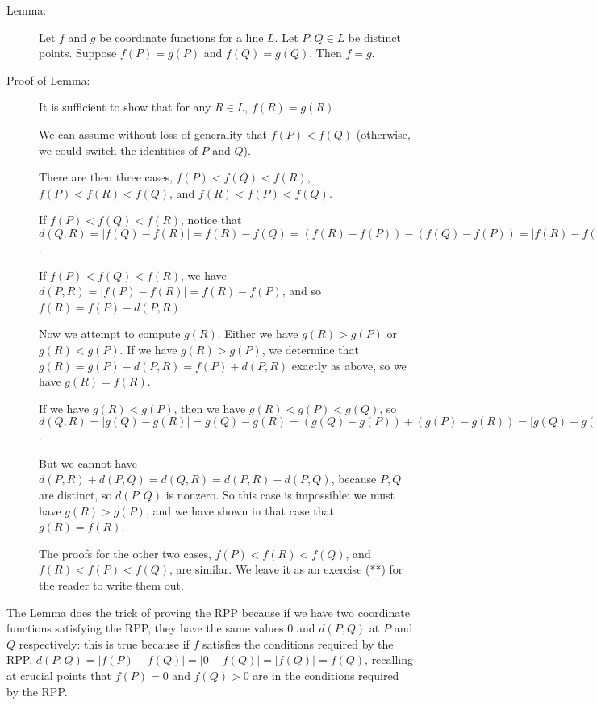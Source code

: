 \documentclass[12pt]{article}
\begin{document}
\begin{description}

\item[Lemma:]  Let $f$ and $g$ be coordinate functions for a line $L$.  Let $P,Q \in L$ be distinct points.  Suppose $f(P)= g(P)$ and
$f(Q)=g(Q)$.   Then $f=g$.

\item[Proof of Lemma:] It is sufficient to show that for any $R \in L$, $f(R)=g(R)$.

We can assume without loss of generality that $f(P) < f(Q)$ (otherwise, we could switch the identities of $P$ and $Q$).

There are then three cases, $f(P) < f(Q) <f(R)$, $f(P) < f(R) <f(Q)$, and $f(R) < f(P) <f(Q)$.

If $f(P)<f(Q)<f(R)$, notice that $d(Q,R) = |f(Q)-f(R)| = f(R)-f(Q)= (f(R)-f(P)) - (f(Q)-f(P)) = |f(R)-f(P)| - |f(Q)-f(P)| = d(P,R)-d(P,Q))$.

If $f(P) < f(Q) <f(R)$, we have $d(P,R) = |f(P)-f(R)| = f(R)-f(P)$, and so $f(R) = f(P)+d(P,R)$. 

Now we attempt to compute $g(R)$.  Either we have $g(R)>g(P)$ or $g(R)<g(P)$.  If we have $g(R)>g(P)$, we determine that $g(R) = g(P) + d(P,R) = f(P)+d(P,R)$ exactly as above, so we have $g(R)=f(R)$.

If we have $g(R)<g(P)$, then we have $g(R) < g(P) < g(Q)$, so $d(Q,R) = |g(Q)-g(R)| = g(Q)-g(R) = (g(Q)-g(P))+(g(P)-g(R)) = |g(Q)-g(P)|+|g(P)-g(R)| = d(P,R)+d(P,Q)$.

But we cannot have $d(P,R)+d(P,Q) = d(Q,R)=d(P,R)-d(P,Q)$, because $P,Q$ are distinct, so $d(P,Q)$ is nonzero.  So this case is impossible:
we must have $g(R)>g(P)$, and we have shown in that case that $g(R)=f(R)$.

The proofs for the other two cases, $f(P) < f(R) <f(Q)$, and $f(R) < f(P) <f(Q)$, are similar.  We leave it as an exercise (**) for the reader to write them out.

\end{description}

The Lemma does the trick of proving the RPP because if we have two coordinate functions satisfying the RPP, they have the same values
0 and $d(P,Q)$ at $P$ and $Q$ respectively:  this is true because if $f$ satisfies the conditions required by the RPP, $d(P,Q) = |f(P)-f(Q)| = |0-f(Q)| = |f(Q)| = f(Q)$, recalling at crucial points that $f(P)=0$ and $f(Q)>0$ are in the conditions required by the RPP.  
\end{document}
